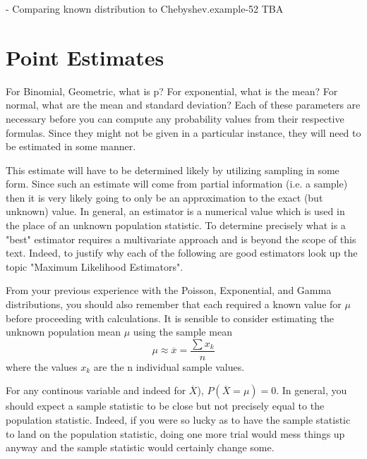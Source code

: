 \documentclass[10pt,]{book}
\numberwithin{equation}{section}
\begin{document}
%
\begin{example}{- Comparing known distribution to Chebyshev.}{example-52}%
\hypertarget{p-1263}{}%
TBA%
\end{example}
%
%
\typeout{************************************************}
\typeout{************************************************}
%
\section[{Point Estimates}]{Point Estimates}\label{section-67}
\hypertarget{p-1264}{}%
For Binomial, Geometric, what is p? For exponential, what is the mean?  For normal, what are the mean and standard deviation? Each of these parameters are necessary before you can compute any probability values from their respective formulas. Since they might not be given in a particular instance, they will need to be estimated in some manner.%
\par
\hypertarget{p-1265}{}%
This estimate will have to be determined likely by utilizing sampling in some form. Since such an estimate will come from partial information (i.e. a sample) then it is very likely going to only be an approximation to the exact (but unknown) value. In general, an estimator is a numerical value which is used in the place of an unknown population statistic. To determine precisely what is a "best" estimator requires a multivariate approach and is beyond the scope of this text. Indeed, to justify why each of the following are good estimators look up the topic "Maximum Likelihood Estimators".%
\par
\hypertarget{p-1266}{}%
From your previous experience with the Poisson, Exponential, and Gamma distributions, you should also remember that each required a known value for \(\mu\) before proceeding with calculations.  It is sensible to consider estimating the unknown population mean \(\mu\) using the sample mean%
\begin{equation*}
\mu \approx \overline{x} = \frac{\sum x_k}{n}
\end{equation*}
where the values \(x_k\) are the n individual sample values.%
\par
\hypertarget{p-1267}{}%
For any continous variable and indeed for \(\overline{X}\)), \(P(\overline{X} = \mu) = 0\). In general, you should expect a sample statistic to be close but not precisely equal to the population statistic. Indeed, if you were so lucky as to have the sample statistic to land on the population statistic, doing one more trial would mess things up anyway and the sample statistic would certainly change some.%
\end{document}
